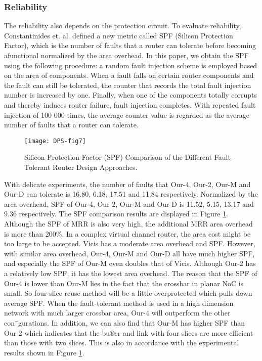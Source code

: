 \subsubsection{Reliability}
The reliability also depends on the protection circuit. To evaluate reliability, Constantinides et. al. \cite{constantinides2006bulletproof} defined a new metric called SPF (Silicon Protection Factor), which is the number of faults that a router can tolerate before becoming afunctional normalized by the area overhead. In this paper, we obtain the SPF using the following procedure: a random fault injection scheme is employed based on the area of components. When a fault falls on certain router components and the fault can still be tolerated, the counter that records the total fault injection number is increased by one. Finally, when one of the components totally corrupts and thereby induces router failure, fault injection completes. With repeated fault injection of 100 000 times, the average counter value is regarded as the average number of faults that a router can tolerate. 

\begin{figure}[h]
      \centering
        \texttt{[image: DPS-fig7]}
        \caption{Silicon Protection Factor (SPF) Comparison of the Different Fault-Tolerant Router Design Approaches.}
        \label{fig:dps-fig7}
\end{figure}


With delicate experiments, the number of faults that Our-4, Our-2, Our-M and Our-D can tolerate is 16.80, 6.18, 17.51 and 11.84 respectively. Normalized by the area overhead, SPF of Our-4, Our-2, Our-M and Our-D is 11.52, 5.15, 13.17 and 9.36 respectively. The SPF comparison results are displayed in Figure \ref{fig:dps-fig7}. Although the SPF of MRR is also very high, the additional MRR area overhead is more than 200\%. In a complex virtual channel router, the area cost might be too large to be accepted. Vicis has a moderate area overhead and SPF. However, with similar area overhead, Our-4, Our-M and Our-D all have much higher SPF, and especially the SPF of Our-M even doubles that of Vicis. Although Our-2 has a relatively low SPF, it has the lowest area overhead. The reason that the SPF of Our-4 is lower than Our-M lies in the fact that the crossbar in planar NoC is small. So four-slice reuse method will be a little overprotected which pulls down average SPF. When the fault-tolerant method is used in a high dimension network with much larger crossbar area, Our-4 will outperform the other con¯gurations. In addition, we can also find that Our-M has higher SPF than Our-2 which indicates that the bu®er and link with four slices are more efficient than those with two slices. This is also in accordance with the experimental results shown in Figure \ref{fig:dps-fig7}.

